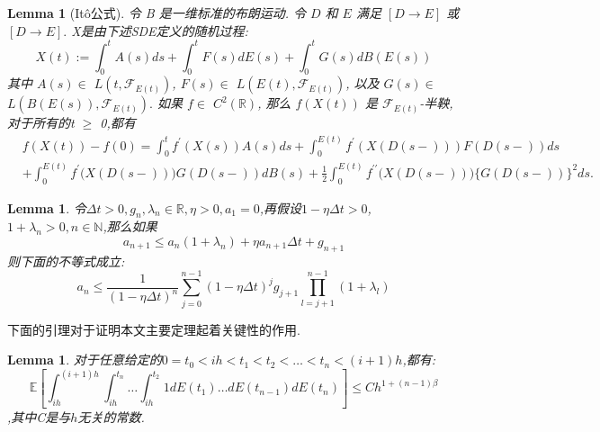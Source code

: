 \documentclass[12pt,final]{article}
\theoremstyle{plain}
\newtheorem{Lemma}[Theorem]{Lemma}      %
\theoremstyle{Definition}
\theoremstyle{Remark}
\begin{document}
	\begin{Lemma}[It\^{o}公式]\label{ito}
		令 B 是一维标准的布朗运动. 令 $D$ 和 $E$ 满足 $[  D\longrightarrow E ]$ 或 $[  D\longrightarrow E ] .$ X是由下述SDE定义的随机过程:
		$$X(t):=\int_0^tA(s)ds+\int_0^tF(s)dE(s)+\int_0^tG(s)dB(E(s))$$
		其中 $A(s)\in$ $L( t, \mathcal{F} _{E(t)})$, $F(s)\in$ $L( E(t), \mathcal{F} _{E(t)})$, 以及 $G(s)\in$ $L( B(E(s)), \mathcal{F} _{E(t)}) .$ 如果 $f\in$ $C^2( \mathbb{R} )$, 那么
		$f(X(t))$ 是 $\mathcal{F}_{E(t)}$-半鞅, 对于所有的t $\ge$ 0,都有
		$$\begin{aligned}
			&f(X(t))-f(0)=\int_{0}^{t}f^{\prime}(X(s))A(s)ds+\int_{0}^{E(t)}f^{\prime}\left(X(D(s-))\right)F(D(s-))ds\\
			&+\int_{0}^{E(t)}f^{\prime}\big(X(D(s-))\big)G(D(s-))dB(s)+\frac{1}{2}\int_{0}^{E(t)}f^{\prime\prime}\big(X(D(s-))\big)\big\{G(D(s-))\big\}^{2}ds.
		\end{aligned}$$
	\end{Lemma}
	\begin{Lemma}\label{Lemma:1}
		令$\Delta t > 0,g_n,\lambda _n \in \mathbb{R},\eta > 0,a_1=0$,再假设$1-\eta \Delta t > 0$,$1 + \lambda _n > 0,n \in \mathbb{N}$,那么如果
		\begin{equation*}
			a_{n+1} \leq a_n(1+\lambda _n)+\eta a_{n+1}\Delta t +g_{n+1}
		\end{equation*}
		则下面的不等式成立:
		\begin{equation}
			a_n \leq \frac{1}{(1-\eta\Delta t)^n}\sum\limits_{j=0}^{n-1}(1-\eta\Delta t)^jg_{j+1}\prod\limits_{l=j+1}^{n-1}(1+\lambda _l)
		\end{equation}
	\end{Lemma}
	下面的引理对于证明本文主要定理起着关键性的作用.
	\begin{Lemma}\label{Lemma:2}
		对于任意给定的$0 = t_0 < ih < t_1 < t_2 < \ldots <t_n <(i+1)h$,都有:
		\begin{equation}
			\mathbb{E}\left[\int_{ih}^{(i+1)h}
			\int_{ih}^{t_n} \ldots \int_{ih}^{t_2} 1 dE(t_1) \ldots dE(t_{n-1})dE(t_n)\right] \le Ch^{1+(n-1)\beta}
		\end{equation}
		,其中C是与$h$无关的常数.
	\end{Lemma}
	
\end{document}
